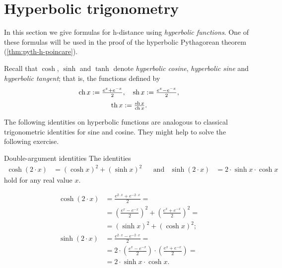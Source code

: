 \section*{Hyperbolic trigonometry}

In this section we give formulas for h-distance using \emph{hyperbolic functions}.
One of these formulas will be used in the proof of the hyperbolic Pythagorean theorem (\ref{thm:pyth-h-poincare}).

Recall that $\cosh$, $\sinh$ and $\tanh$ denote \emph{hyperbolic cosine}, \emph{hyperbolic sine} and \emph{hyperbolic tangent};
that is, the functions defined by
\[\operatorname{ch} x:= \tfrac{e^x+e^{-x}}2,
 \quad
 \operatorname{sh} x:= \tfrac{e^x-e^{-x}}2,
\]
\[\operatorname{th} x:= \tfrac{\operatorname{sh} x}{\operatorname{ch} x}.
\]

The following identities on hyperbolic functions are analogous to classical trigonometric identities for sine and cosine. 
They might help to solve the following exercise. 

\begin{thm}{Double-argument identities}\label{double-argument}
The identities
\begin{align*}
\cosh (2\cdot x)&=(\cosh x)^2+(\sinh x)^2 
&&\text{and}&
\sinh (2\cdot x)&=2\cdot\sinh x\cdot \cosh x
\end{align*}
hold for any real value $x$.
\end{thm}
\qedsf

\begin{align*}
\cosh (2\cdot x)
&=\tfrac{e^{2\cdot x}+e^{-2\cdot x}}2=
\\
&=\left(\tfrac{e^x-e^{-x}}2\right)^2+\left(\tfrac{e^x+e^{-x}}2\right)^2=
\\
&=(\sinh x)^2+(\cosh x)^2;
\\
\sinh (2\cdot x)
&=\tfrac{e^{2\cdot x}-e^{-2\cdot x}}2=
\\
&=2\cdot\left(\tfrac{e^x-e^{-x}}2\right)\cdot\left(\tfrac{e^x+e^{-x}}2\right)=
\\
&=2\cdot\sinh x\cdot \cosh x.
\end{align*}

